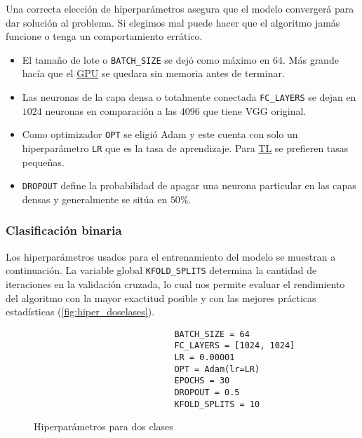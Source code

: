 Una correcta elección de hiperparámetros asegura que el modelo convergerá para
dar solución al problema. Si elegimos mal puede hacer que el algoritmo jamás
funcione o tenga un comportamiento errático. 

\begin{itemize}
    \item El tamaño de lote o \texttt{BATCH_SIZE} se dejó como máximo
    en $64$. Más grande hacía que el \hyperlink{abbr}{GPU} se quedara sin
    memoria antes de terminar.
    \item Las neuronas de la capa densa o totalmente conectada
    \texttt{FC_LAYERS} se dejan en $1024$ neuronas en comparación a
    las $4096$ que tiene VGG original.
    \item Como optimizador \texttt{OPT} se eligió Adam y este cuenta
    con solo un hiperparámetro \texttt{LR} que es la tasa de
    aprendizaje. Para \hyperlink{abbr}{TL} se prefieren tasas pequeñas.
    \item \texttt{DROPOUT} define la probabilidad de apagar una
    neurona particular en las capas densas y generalmente se sitúa en $50\%$.
\end{itemize}

\subsubsection{Clasificación binaria}

Los hiperparámetros usados para el entrenamiento del modelo se muestran a
continuación. La variable global \texttt{KFOLD_SPLITS} determina la
cantidad de iteraciones en la validación cruzada, lo cual nos permite evaluar el
rendimiento del algoritmo con la mayor exactitud posible y con las mejores
prácticas estadísticas (\autoref{fig:hiper_dosclases}).

\begin{figure}[H]
    \centering
    \begin{verbatim}
                            BATCH_SIZE = 64
                            FC_LAYERS = [1024, 1024]
                            LR = 0.00001
                            OPT = Adam(lr=LR)
                            EPOCHS = 30
                            DROPOUT = 0.5
                            KFOLD_SPLITS = 10
    \end{verbatim}
     \caption{Hiperparámetros para dos clases}
     \label{fig:hiper_dosclases}
\end{figure}

